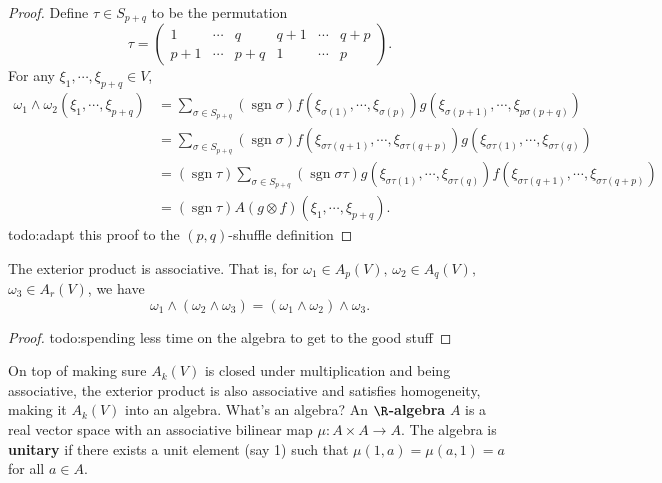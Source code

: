 \begin{proof}
        Define $\tau \in S_{p+q}$ to be the permutation \[
    \tau=
    \begin{pmatrix}
        1 & \cdots  & q & q+1 & \cdots  & q +p\\
        p+1 & \cdots  & p+q & 1 & \cdots  & p
    \end{pmatrix}.
\] For any $\xi_1,\cdots ,\xi_{p+q}\in V$,
\begin{align*}
    \omega_1\wedge \omega_2(\xi_1,\cdots ,\xi_{p+q})&=\sum _{\sigma \in S_{p+q}}(\operatorname{sgn}\sigma)f(\xi_{\sigma(1)},\cdots ,\xi_{\sigma(p)})g(\xi_{\sigma(p+1)},\cdots ,\xi_{p\sigma(p+q)})\\
                                         &= \sum _{\sigma \in S_{p+q}}(\operatorname{sgn}\sigma)f (\xi_{\sigma\tau(q+1)},\cdots , \xi _{\sigma\tau(q+p)})g(\xi_{\sigma\tau(1)},\cdots ,\xi_{\sigma\tau(q)})\\
                                         &=(\operatorname{sgn}\tau) \sum _{\sigma\in S_{p+q}}(\operatorname{sgn}\sigma\tau) g (\xi_{\sigma\tau(1)},\cdots , \xi_{\sigma\tau(q)})f(\xi_{\sigma\tau(q+1)},\cdots ,\xi_{\sigma\tau(q+p)})\\
                                         &=(\operatorname{sgn}\tau)A (g\otimes f)(\xi_1,\cdots ,\xi_{p+q}).
\end{align*}{\color{red}todo:adapt this proof to the $(p,q)$-shuffle definition} 
\end{proof}
\begin{lemma}
    The exterior product is associative. That is, for $\omega_1\in A_p(V),\,\omega_2\in A_q(V),$ $\omega_3 \in A_r(V)$, we have \[
        \omega_1\wedge (\omega_2\wedge \omega_3)=(\omega_1\wedge\omega_2)\wedge\omega_3.
    \] 
\end{lemma}
\begin{proof}
    {\color{red}todo:spending less time on the algebra to get to the good stuff} 
\end{proof}
On top of making sure $A_k(V)$ is closed under multiplication and being associative, the exterior product is also associative and satisfies homogeneity, making it $A_k(V)$ into an algebra. What's an algebra? An $\R$\textbf{-algebra}  $A$ is a real vector space with an associative bilinear map $\mu \colon A\times A \to A$. The algebra is \textbf{unitary} if there exists a unit element (say 1) such that $\mu(1,a)=\mu(a,1)=a$ for all $a \in A$.
